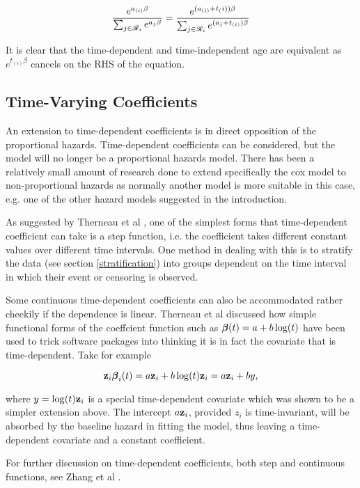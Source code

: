 \begin{equation}
    \frac{e^{a_{(i)}\beta}}{\sum_{j\in\mathscr{R}_i}e^{a_j\beta}}=\frac{e^{(a_{(i)}+t_({i}))\beta}}{\sum_{j\in\mathscr{R}_i}e^{(a_j+t_{(i)})\beta}}
\end{equation}

It is clear that the time-dependent and time-independent age are equivalent as $e^{t_{(i)}\beta}$ cancels on the RHS of the equation.

\subsection{Time-Varying Coefficients}

An extension to time-dependent coefficients is in direct opposition of the proportional hazards. Time-dependent coefficients can be considered, but the model will no longer be a proportional hazards model. There has been a relatively small amount of research done to extend specifically the cox model to non-proportional hazards as normally another model is more suitable in this case, e.g. one of the other hazard models suggested in the introduction. 

As suggested by Therneau et al , one of the simplest forms that time-dependent coefficient can take is a step function, i.e. the coefficient takes different constant values over different time intervals. One method in dealing with this is to stratify the data (see section \ref{stratification}) into groups dependent on the time interval in which their event or censoring is observed.

Some continuous time-dependent coefficients can also be accommodated rather cheekily if the dependence is linear. Therneau et al  discussed how simple functional forms of the coeffcient function such as $\boldsymbol{\beta}(t)=a+b\log(t)$ have been used to trick software packages into thinking it is in fact the covariate that is time-dependent. Take for example 

$$\textbf{z}_i\boldsymbol{\beta}_i(t)=a\textbf{z}_i+ b\log(t)\textbf{z}_i=a\textbf{z}_i+by,$$

where $y=\log(t)\textbf{z}_i$ is a special time-dependent covariate which was shown to be a simpler extension above. The intercept $a\textbf{z}_i$, provided $z_i$ is time-invariant, will be absorbed by the baseline hazard in fitting the model, thus leaving a time-dependent covariate and a constant coefficient.

For further discussion on time-dependent coefficients, both step and continuous functions, see Zhang et al .

